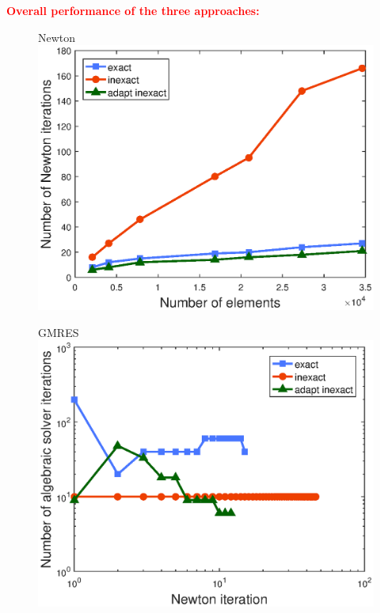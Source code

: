 \documentclass[10 pt]{beamer}
\begin{document}
\begin{frame}


\textcolor{red}{\textbf{Overall performance of the three approaches:}}
\begin{figure}[H]
\begin{minipage}[c]{.42\linewidth}
   \centering 
   Newton
\includegraphics[width=\textwidth]{fig_article/number_newton_iter_three_methods_with_number_elements.eps}    
\end{minipage}\hfill
\begin{minipage}[c]{.42\linewidth}
\centering
GMRES
\includegraphics[width=\textwidth]{fig_article/number_algebraic_iter_per_newton_step_three_method.eps}    

\end{minipage}
\end{figure}
\end{frame}
\end{document}
